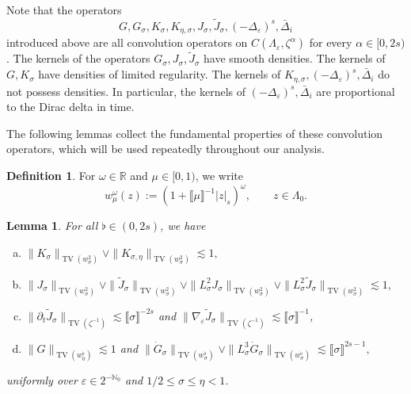 \documentclass{article}
\numberwithin{equation}{section}
\newcommand{\assign}{:=}
\theoremstyle{plain}
\newtheorem{lemma}[theorem]{Lemma}
\theoremstyle{definition}
\newtheorem{definition}[theorem]{Definition}
\begin{document}
Note that the operators
\[ G, G_{\sigma}, K_{\sigma}, K_{\eta, \sigma}, J_{\sigma},
   \tilde{J}_{\sigma}, (- \Delta_{\varepsilon})^s, \bar{\Delta}_i \]
introduced above are all convolution operators on $C (\Lambda_{\varepsilon},
\zeta^{\alpha})$ for every $\alpha \in [0, 2 s)$. The kernels of the operators
$G_{\sigma}, J_{\sigma}, \tilde{J}_{\sigma}$ have smooth densities. The
kernels of $G, K_{\sigma}$ have densities of limited regularity. The kernels
of $K_{\eta, \sigma}, (- \Delta_{\varepsilon})^s, \bar{\Delta}_i$ do not
possess densities. In particular, the kernels of $(- \Delta_{\varepsilon})^s,
\bar{\Delta}_i$ are proportional to the Dirac delta in time.

The following lemmas collect the fundamental properties of these convolution
operators, which will be used repeatedly throughout our analysis.

\begin{definition}
  \label{def:weight-w}For $\omega \in \mathbb{R}$ and $\mu \in [0, 1)$, we
  write
  \[ w_{\mu}^{\omega} (z) \assign (1 + \llbracket \mu \rrbracket^{- 1} | z
     |_s)^{\omega}, \qquad z \in \Lambda_0 . \]
\end{definition}

\begin{lemma}
  \label{lem:bounds-K-J}For all $\flat \in (0, 2 s)$, we have
  \begin{enumerate}[(a)]
    \item $\| {K_{\sigma}}  \|_{\operatorname{TV} ( {w^2_{\sigma}} 
    )} \vee \| {K_{\sigma, \eta}}  \|_{\operatorname{TV} (
    {w^2_{\sigma}}  )} \lesssim 1,$
    
    \item $\| J_{\sigma} \|_{\operatorname{TV} ( {w^2_{\sigma}}  )} \vee \|
    \tilde{J}_{\sigma} \|_{\operatorname{TV} ( {w^2_{\sigma}}  )} \vee \|
    L^2_{\sigma} J_{\sigma} \|_{\operatorname{TV} ( {w^2_{\sigma}}  )} \vee
    \| L^2_{\sigma} \tilde{J}_{\sigma} \|_{\operatorname{TV} ( {w^2_{\sigma}} 
    )} \lesssim 1,$
    
    \item $\| \partial_t \tilde{J}_{\sigma} \|_{\operatorname{TV} (
    {\zeta^{-1}}  )} \lesssim \llbracket \sigma \rrbracket^{- 2 s}$
    and $\| \nabla_{\varepsilon} \tilde{J}_{\sigma} \|_{\operatorname{TV} (
    {\zeta^{-1}}  )} \lesssim \llbracket \sigma \rrbracket^{- 1}$,
    
    \item $\| G \|_{\operatorname{TV} ( {w^{\flat}_0}  )} \lesssim 1$ and
    $\| \dot{G}_{\sigma} \|_{\operatorname{TV} ( {w^{\flat}_{\sigma}}  )}
    \vee \| L_{\sigma}^3 \dot{G}_{\sigma} \|_{\operatorname{TV} (
    {w^{\flat}_{\sigma}}  )} \lesssim \llbracket \sigma \rrbracket^{2 s
    - 1},$
  \end{enumerate}
  uniformly over $\varepsilon \in 2^{-\mathbb{N}_0}$ and $1 / 2 \leqslant
  \sigma \leqslant \eta < 1$.
\end{lemma}
\end{document}
